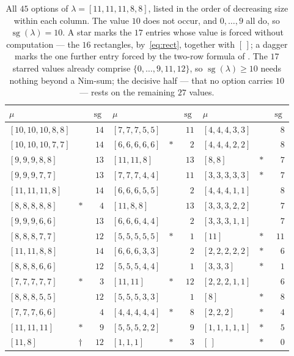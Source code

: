\documentclass[11pt]{amsart}
\theoremstyle{definition}
\theoremstyle{remark}
\newcommand{\br}[1]{[#1]}
\newcommand{\sgv}{\operatorname{sg}}
\begin{document}
\begin{table}[htb]
\small
\begin{tabular}{llr@{\qquad}llr@{\qquad}llr}
$\mu$ & & $\sgv$ & $\mu$ & & $\sgv$ & $\mu$ & & $\sgv$\\
\hline
$\br{10,10,10,8,8}$ &        & $14$ & $\br{7,7,7,5,5}$ &        & $11$ & $\br{4,4,4,3,3}$ &        & $8$\\
$\br{10,10,10,7,7}$ &        & $14$ & $\br{6,6,6,6,6}$ & $\ast$ & $2$  & $\br{4,4,4,2,2}$ &        & $8$\\
$\br{9,9,9,8,8}$    &        & $13$ & $\br{11,11,8}$   &        & $13$ & $\br{8,8}$       & $\ast$ & $7$\\
$\br{9,9,9,7,7}$    &        & $13$ & $\br{7,7,7,4,4}$ &        & $11$ & $\br{3,3,3,3,3}$ & $\ast$ & $7$\\
$\br{11,11,11,8}$   &        & $14$ & $\br{6,6,6,5,5}$ &        & $2$  & $\br{4,4,4,1,1}$ &        & $8$\\
$\br{8,8,8,8,8}$    & $\ast$ & $4$  & $\br{11,8,8}$    &        & $13$ & $\br{3,3,3,2,2}$ &        & $7$\\
$\br{9,9,9,6,6}$    &        & $13$ & $\br{6,6,6,4,4}$ &        & $2$  & $\br{3,3,3,1,1}$ &        & $7$\\
$\br{8,8,8,7,7}$    &        & $12$ & $\br{5,5,5,5,5}$ & $\ast$ & $1$  & $\br{11}$        & $\ast$ & $11$\\
$\br{11,11,8,8}$    &        & $14$ & $\br{6,6,6,3,3}$ &        & $2$  & $\br{2,2,2,2,2}$ & $\ast$ & $6$\\
$\br{8,8,8,6,6}$    &        & $12$ & $\br{5,5,5,4,4}$ &        & $1$  & $\br{3,3,3}$     & $\ast$ & $1$\\
$\br{7,7,7,7,7}$    & $\ast$ & $3$  & $\br{11,11}$     & $\ast$ & $12$ & $\br{2,2,2,1,1}$ &        & $6$\\
$\br{8,8,8,5,5}$    &        & $12$ & $\br{5,5,5,3,3}$ &        & $1$  & $\br{8}$         & $\ast$ & $8$\\
$\br{7,7,7,6,6}$    &        & $4$  & $\br{4,4,4,4,4}$ & $\ast$ & $8$  & $\br{2,2,2}$     & $\ast$ & $4$\\
$\br{11,11,11}$     & $\ast$ & $9$  & $\br{5,5,5,2,2}$ &        & $9$  & $\br{1,1,1,1,1}$ & $\ast$ & $5$\\
$\br{11,8}$         & $\dag$ & $12$ & $\br{1,1,1}$     & $\ast$ & $3$  & $\br{\,}$        & $\ast$ & $0$\\
\end{tabular}
\medskip
\caption{All $45$ options of $\lambda=\br{11,11,11,8,8}$, listed in the order
of decreasing size within each column. The value $10$ does not occur, and
$0,\dots,9$ all do, so $\sgv(\lambda)=10$. A star marks the $17$ entries whose
value is forced without computation --- the $16$ rectangles, by~\eqref{eq:rect},
together with $\br{\,}$; a dagger marks the one further entry forced by the
two-row formula of \cite[Prop.~4.9]{GKM}. The $17$ starred values already
comprise $\{0,\dots,9,11,12\}$, so $\sgv(\lambda)\ge10$ needs nothing beyond a
Nim-sum; the decisive half --- that no option carries $10$ --- rests on the
remaining $27$ values.}
\label{tab:mex}
\end{table}
\end{document}
